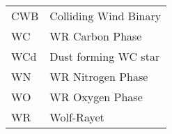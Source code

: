 \begin{abbreviations}

\begin{table}[h]
\centering
\begin{tabular}{ll}

CWB & Colliding Wind Binary \\
WC  & WR Carbon Phase \\
WCd & Dust forming WC star \\
WN  & WR Nitrogen Phase \\
WO  & WR Oxygen Phase \\
WR  & Wolf-Rayet \\

\end{tabular} 
\label{tbl:Abbreviations}
\end{table}

\end{abbreviations}
